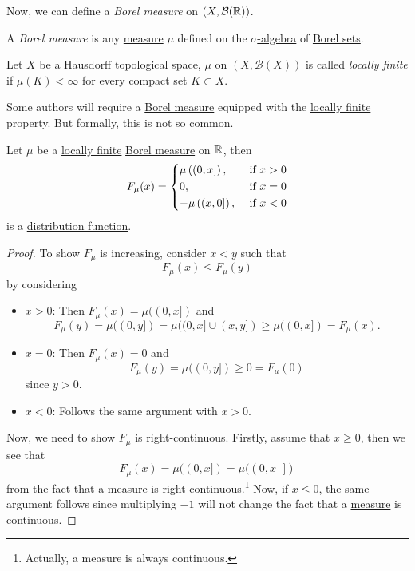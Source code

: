 \hr

Now, we can define a \emph{Borel measure} on \((X, \mathcal{\MakeUppercase{B}} (\mathbb{\MakeUppercase{r}} ))\).
\begin{definition}\label{def:Borel-measure}
	A \emph{Borel measure} is any \hyperref[def:measure]{measure} \(\mu\) defined on the \hyperref[def:sigma-algebra]{\(\sigma\)-algebra} of \hyperref[def:Borel-set]{Borel sets}.
\end{definition}

\begin{definition}\label{def:locally-finite}
	Let \(X\) be a Hausdorff topological space, \(\mu\) on \((X, \mathcal{B} (X))\) is called \emph{locally finite} if \(\mu (K)<\infty \)
	for every compact set \(K\subset X\).
\end{definition}

\begin{note}
	Some authors will require a \hyperref[def:Borel-measure]{Borel measure} equipped with the \hyperref[def:locally-finite]{locally finite} property.
	But formally, this is not so common.
\end{note}

\begin{lemma}
	Let \(\mu \) be a \hyperref[def:locally-finite]{locally finite} \hyperref[def:Borel-measure]{Borel measure} on
	\(\mathbb{\MakeUppercase{R}} \), then
	\[
		F_{\mu }(x) = \begin{dcases}
			\mu \left((0, x]\right),  & \text{ if } x > 0 \\
			0,                        & \text{ if } x = 0 \\
			-\mu \left((x, 0]\right), & \text{ if } x < 0
		\end{dcases}
	\]
	is a \hyperref[def:distribution-function]{distribution function}.
\end{lemma}
\begin{proof}
	To show \(F_\mu\) is increasing, consider \(x<y\) such that
	\[
		F_\mu (x) \leq F_\mu (y)
	\]
	by considering
	\begin{itemize}
		\item \(x>0\): Then \(F_\mu (x) = \mu ((0, x])\) and
		      \[
			      F_\mu (y) = \mu ((0, y]) = \mu ((0, x]\cup (x, y]) \geq \mu ((0, x]) = F_\mu (x).
		      \]
		\item \(x=0\): Then \(F_\mu (x) = 0\) and
		      \[
			      F_\mu (y) = \mu ((0, y])\geq 0 = F_\mu (0)
		      \]
		      since \(y>0\).
		\item \(x<0\): Follows the same argument with \(x>0\).
	\end{itemize}

	\par Now, we need to show \(F_\mu \) is right-continuous. Firstly, assume that \(x \geq 0\), then we see that
	\[
		F_\mu(x) = \mu ((0, x]) = \mu ((0, x^+])
	\]
	from the fact that a measure is right-continuous.\footnote{Actually, a measure is always continuous.} Now, if \(x\leq 0\),
	the same argument follows since multiplying \(-1\) will not change the fact that a \hyperref[def:measure]{measure} is continuous.
\end{proof}

